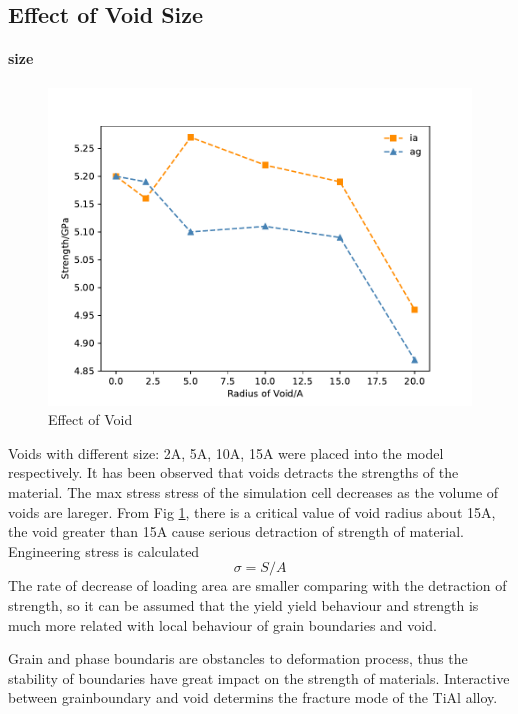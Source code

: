 \documentclass[final,5pt,times]{elsarticle}
\begin{document}
	
	
	
	\subsection{Effect of Void Size}
	\paragraph{size}
	
	\begin{figure}[h]
		\centering
		\includegraphics[width=0.7\linewidth]{img/effect_of_vol}
		\caption{Effect of Void}
		\label{fig:voleff}
	\end{figure}
	
	
	Voids with different size: 2A, 5A, 10A, 15A were placed into the model respectively. It has been observed that  voids detracts the strengths of the material. The max stress stress of the simulation cell decreases as the volume of voids are lareger. From Fig \ref{fig:voleff}, there is a critical value of void radius about 15A, the void greater than 15A cause serious detraction of strength of material. 
	Engineering stress is calculated
	$$ \sigma = S/A$$
	The rate of decrease of loading area are smaller comparing with the detraction of strength, so it can be assumed that the yield yield behaviour and strength is much more related with local behaviour of grain boundaries and void.
	
	Grain and phase boundaris are obstancles to deformation process, thus the stability of boundaries have great impact on the strength of materials. Interactive between grainboundary and void determins the fracture mode of the TiAl alloy.
	
\end{document}
